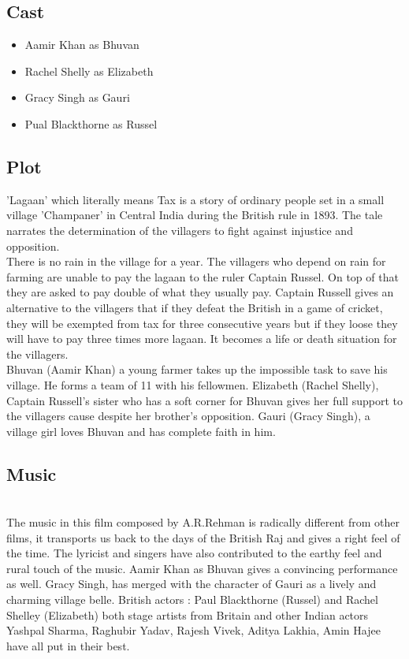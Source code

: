 \documentclass[a4paper]{article}
\begin{document}
	  \subsection {Cast}
	  \begin{itemize}
\item Aamir Khan as Bhuvan
\item Rachel Shelly as Elizabeth
\item Gracy Singh as Gauri
\item Pual Blackthorne as Russel
\end{itemize}
	  \subsection{Plot }
    
	  'Lagaan' which literally means Tax is a story of ordinary people set in a small village 'Champaner' in Central India during the British rule in 1893. The tale narrates the determination of the villagers to fight against injustice and opposition.
	  \\
	  There is no rain in the village for a year. The villagers who depend on rain for farming are unable to pay the lagaan to the ruler Captain Russel. On top of that they are asked to pay double of what they usually pay. Captain Russell gives an alternative to the villagers that if they defeat the British in a game of cricket, they will be exempted from tax for three consecutive years but if they loose they will have to pay three times more lagaan. It becomes a life or death situation for the villagers.
\\	  
	  Bhuvan (Aamir Khan) a young farmer takes up the impossible task to save his village. He forms a team of 11 with his fellowmen. Elizabeth (Rachel Shelly), Captain Russell's sister who has a soft corner for Bhuvan gives her full support to the villagers cause despite her brother's opposition. Gauri (Gracy Singh), a village girl loves Bhuvan and has complete faith in him.


\subsection{Music}

\\
The music in this film composed by A.R.Rehman is radically different from other films, it transports us back to the days of the British Raj and gives a right feel of the time. The lyricist and singers have also contributed to the earthy feel and rural touch of the music. Aamir Khan as Bhuvan gives a convincing performance as well. Gracy Singh, has merged with the character of Gauri as a lively and charming village belle. British actors : Paul Blackthorne (Russel) and Rachel Shelley (Elizabeth) both stage artists from Britain and other Indian actors Yashpal Sharma, Raghubir Yadav, Rajesh Vivek, Aditya Lakhia, Amin Hajee have all put in their best.
\end{document}
